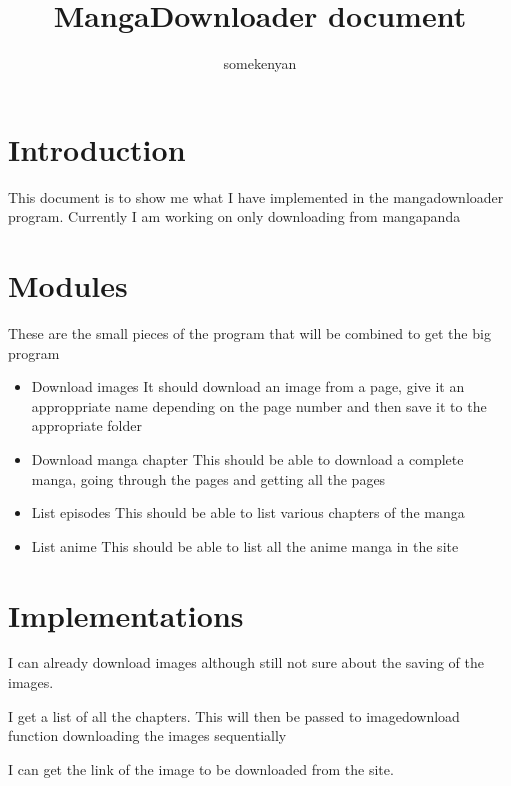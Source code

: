 \documentclass{article}
\begin{document}
\author{somekenyan}
\title{MangaDownloader document}
\maketitle

\section{Introduction}

This document is to show me what I have implemented in the mangadownloader program. Currently I am working on only downloading from mangapanda

\section{Modules}
These are the small pieces of the program that will be combined to get the big program

\begin{itemize}
\item Download images
It should download an image from a page, give it an approppriate name depending on the page number and then save it to the appropriate folder
\item Download manga chapter
This should be able to download a complete manga, going through the pages and getting all the pages
\item List episodes
This should be able to list various chapters of the manga
\item List anime
This should be able to list all the anime manga in the site
\end{itemize}


\section{Implementations}

I can already download images although still not sure about the saving of the images.

I get a list of all the chapters. This will then be passed to imagedownload function downloading the images sequentially

I can get the link of the image to be downloaded from the site.
\end{document}
